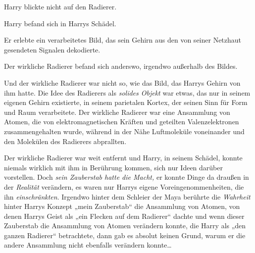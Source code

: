 Harry blickte nicht auf den Radierer.

Harry befand sich in Harrys Schädel.

Er erlebte ein verarbeitetes Bild, das sein Gehirn aus den von seiner Netzhaut gesendeten Signalen dekodierte.

Der wirkliche Radierer befand sich anderswo, irgendwo außerhalb des Bildes.

Und der wirkliche Radierer war nicht so, wie das Bild, das Harrys Gehirn von ihm hatte. Die Idee des Radierers als \emph{solides Objekt} war etwas, das nur in seinem eigenen Gehirn existierte, in seinem parietalen Kortex, der seinen Sinn für Form und Raum verarbeitete. Der wirkliche Radierer war eine Ansammlung von Atomen, die von elektromagnetischen Kräften und geteilten Valenzelektronen zusammengehalten wurde, während in der Nähe Luftmoleküle voneinander und den Molekülen des Radierers abprallten.

Der wirkliche Radierer war weit entfernt und Harry, in seinem Schädel, konnte niemals wirklich mit ihm in Berührung kommen, sich nur Ideen darüber vorstellen. Doch \emph{sein Zauberstab hatte die Macht,} er konnte Dinge da draußen in der \emph{Realität} verändern, es waren nur Harrys eigene Voreingenommenheiten, die ihn \emph{einschränkten}. Irgendwo hinter dem Schleier der Maya berührte die \emph{Wahrheit} hinter Harrys Konzept „mein Zauberstab“ die Ansammlung von Atomen, von denen Harrys Geist als „ein Flecken auf dem Radierer“ dachte und wenn dieser Zauberstab die Ansammlung von Atomen verändern konnte, die Harry als „den ganzen Radierer“ betrachtete, dann gab es absolut keinen Grund, warum er die andere Ansammlung nicht ebenfalls verändern konnte…

